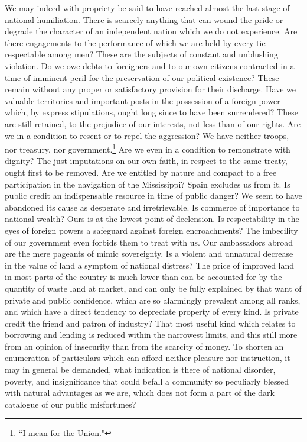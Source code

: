 We may indeed with propriety be said to have reached almost the last stage of national humiliation. 
There is scarcely anything that can wound the pride or degrade the character of an independent nation which we do not experience. 
Are there engagements to the performance of which we are held by every tie respectable among men? 
These are the subjects of constant and unblushing violation. 
Do we owe debts to foreigners and to our own citizens contracted in a time of imminent peril for the preservation of our political existence? 
These remain without any proper or satisfactory provision for their discharge. 
Have we valuable territories and important posts in the possession of a foreign power which, by express stipulations, ought long since to have been surrendered? 
These are still retained, to the prejudice of our interests, not less than of our rights. 
Are we in a condition to resent or to repel the aggression? 
We have neither troops, nor treasury, nor government.\footnote{``I mean for the Union."} Are we even in a condition to remonstrate with dignity? 
The just imputations on our own faith, in respect to the same treaty, ought first to be removed. 
Are we entitled by nature and compact to a free participation in the navigation of the Mississippi? 
Spain excludes us from it. 
Is public credit an indispensable resource in time of public danger? 
We seem to have abandoned its cause as desperate and irretrievable. 
Is commerce of importance to national wealth? 
Ours is at the lowest point of declension. 
Is respectability in the eyes of foreign powers a safeguard against foreign encroachments? 
The imbecility of our government even forbids them to treat with us. 
Our ambassadors abroad are the mere pageants of mimic sovereignty. 
Is a violent and unnatural decrease in the value of land a symptom of national distress? 
The price of improved land in most parts of the country is much lower than can be accounted for by the quantity of waste land at market, and can only be fully explained by that want of private and public confidence, which are so alarmingly prevalent among all ranks, and which have a direct tendency to depreciate property of every kind. 
Is private credit the friend and patron of industry? 
That most useful kind which relates to borrowing and lending is reduced within the narrowest limits, and this still more from an opinion of insecurity than from the scarcity of money. 
To shorten an enumeration of particulars which can afford neither pleasure nor instruction, it may in general be demanded, what indication is there of national disorder, poverty, and insignificance that could befall a community so peculiarly blessed with natural advantages as we are, which does not form a part of the dark catalogue of our public misfortunes?

